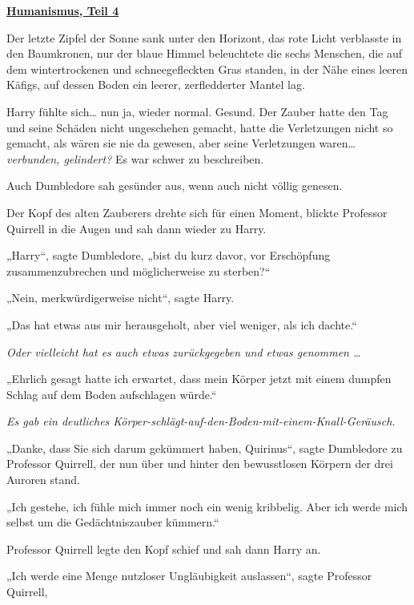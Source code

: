 

\hypertarget{humanismus-teil-4}{%

\textbf{\uline{Humanismus, Teil 4}}

Der letzte Zipfel der Sonne sank unter den Horizont, das rote Licht verblasste in den Baumkronen, nur der blaue Himmel beleuchtete die sechs Menschen, die auf dem wintertrockenen und schneegefleckten Gras standen, in der Nähe eines leeren Käfigs, auf dessen Boden ein leerer, zerfledderter Mantel lag.

Harry fühlte sich… nun ja, wieder normal. Gesund. Der Zauber hatte den Tag und seine Schäden nicht ungeschehen gemacht, hatte die Verletzungen nicht so gemacht, als wären sie nie da gewesen, aber seine Verletzungen waren… \emph{verbunden, gelindert?} Es war schwer zu beschreiben.

Auch Dumbledore sah gesünder aus, wenn auch nicht völlig genesen.

Der Kopf des alten Zauberers drehte sich für einen Moment, blickte Professor Quirrell in die Augen und sah dann wieder zu Harry.

„Harry“, sagte Dumbledore, „bist du kurz davor, vor Erschöpfung zusammenzubrechen und möglicherweise zu sterben?“

„Nein, merkwürdigerweise nicht“, sagte Harry.

„Das hat etwas aus mir herausgeholt, aber viel weniger, als ich dachte.“

\emph{Oder vielleicht hat es auch etwas zurückgegeben und etwas genommen …}

„Ehrlich gesagt hatte ich erwartet, dass mein Körper jetzt mit einem dumpfen Schlag auf dem Boden aufschlagen würde.“

\emph{Es gab ein deutliches Körper-schlägt-auf-den-Boden-mit-einem-Knall-Geräusch.}

„Danke, dass Sie sich darum gekümmert haben, Quirinus“, sagte Dumbledore zu Professor Quirrell, der nun über und hinter den bewusstlosen Körpern der drei Auroren stand.

„Ich gestehe, ich fühle mich immer noch ein wenig kribbelig. Aber ich werde mich selbst um die Gedächtniszauber kümmern.“

Professor Quirrell legte den Kopf schief und sah dann Harry an.

„Ich werde eine Menge nutzloser Ungläubigkeit auslassen“, sagte Professor Quirrell,

}
